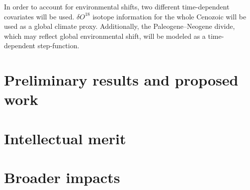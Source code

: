 \documentclass[11pt,letterpaper]{article}
\begin{document}
In order to account for environmental shifts, two different time-dependent covariates will be used. \(\delta O^{18}\) isotope information for the whole Cenozoic \citep{Zachos2008} will be used as a global climate proxy. Additionally, the Paleogene--Neogene divide, which may reflect global environmental shift, will be modeled as a time-dependent step-function.
% 
%

\section{Preliminary results and proposed work}


%
%

\section{Intellectual merit}
%
%

\section{Broader impacts}
%
%


\end{document}
